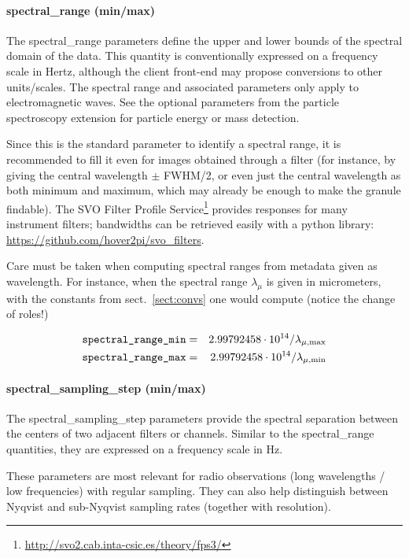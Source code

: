 \documentclass[11pt,a4paper]{ivoa}
\begin{document}
\paragraph{spectral\_range (min/max)}

The spectral\_range parameters define the upper and lower bounds of the
spectral domain of the data. This quantity is conventionally expressed
on a frequency scale in Hertz, although the client front-end may propose
conversions to other units/scales. The spectral range and associated
parameters only apply to electromagnetic waves. See the optional
parameters from the particle spectroscopy extension for particle energy or mass detection.

Since this is the standard parameter to identify a spectral range, it
is recommended to fill it even for images obtained through a filter
(for instance, by giving the central wavelength $\pm$ FWHM/2,
or even just the central wavelength as both minimum and maximum,
which may already be enough to make the granule findable).
The SVO Filter Profile
Service\footnote{\url{http://svo2.cab.inta-csic.es/theory/fps3/}}
provides responses for many instrument filters;
bandwidths can be retrieved easily with a python library:
\url{https://github.com/hover2pi/svo_filters}.

Care must be taken when computing spectral ranges from metadata given as
wavelength.  For instance, when the spectral range $\lambda_\mu$ is
given in micrometers, with the constants from sect.~\ref{sect:convs} one
would compute (notice the change of roles!)

\begin{eqnarray*}
\hbox{\texttt{spectral\_range\_min}} &=&
  2.99792458\cdot 10^{14}/\lambda_{\mu,\textrm{max}}\\
\hbox{\texttt{spectral\_range\_max}} &=&
  2.99792458\cdot 10^{14}/\lambda_{\mu,\textrm{min}}\\
\end{eqnarray*}

\paragraph{spectral\_sampling\_step (min/max)}

The spectral\_sampling\_step parameters provide the spectral separation
between the centers of two adjacent filters or channels. Similar to the
spectral\_range quantities, they are expressed on a frequency scale in Hz.

These parameters are most relevant for radio observations
(long wavelengths / low frequencies) with regular sampling.
They can also help distinguish between Nyqvist and sub-Nyqvist
sampling rates (together with resolution).
\end{document}
